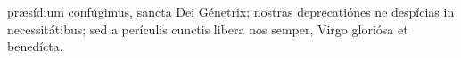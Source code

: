 pr{\ae}sídium confúgimus, sancta Dei Génetrix; nostras deprecatiónes ne despícias
in necessitátibus; sed a perículis cunctis libera nos semper, Virgo gloriósa et benedícta.